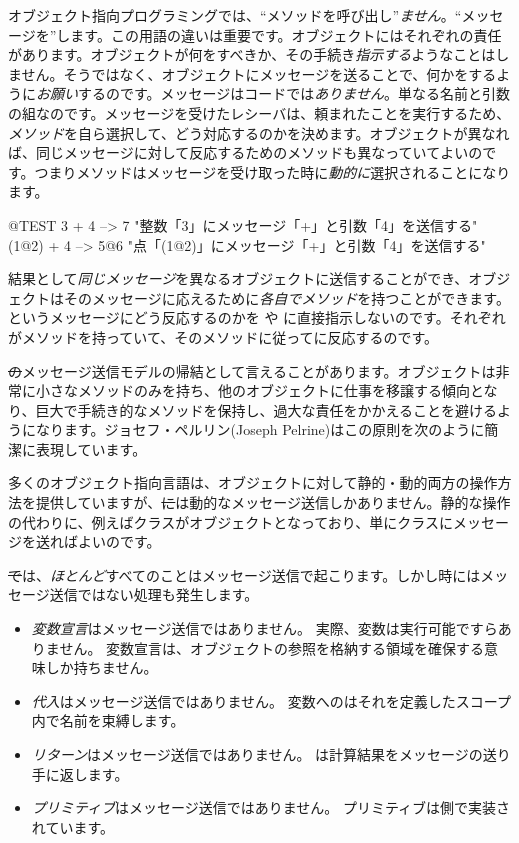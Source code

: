 \documentclass[a4paper,10pt,twoside]{book}
\begin{document}
オブジェクト指向プログラミングでは、``メソッドを呼び出し''\emph{ません}。``メッセージを''します。この用語の違いは重要です。オブジェクトにはそれぞれの責任があります。オブジェクトが何をすべきか、その手続き\emph{指示する}ようなことはしません。そうではなく、オブジェクトにメッセージを送ることで、何かをするように\emph{お願い}するのです。メッセージはコードでは\emph{ありません}。単なる名前と引数の組なのです。メッセージを受けたレシーバは、頼まれたことを実行するため、\emph{メソッド}を自ら選択して、どう対応するのかを決めます。オブジェクトが異なれば、同じメッセージに対して反応するためのメソッドも異なっていてよいのです。つまりメソッドはメッセージを受け取った時に\emph{動的に}選択されることになります。

\begin{code}{@TEST}
3 + 4         --> 7          "整数「3」にメッセージ「+」と引数「4」を送信する"
(1@2) + 4 --> 5@6    "点「(1@2)」にメッセージ「+」と引数「4」を送信する"
\end{code}

\noindent
結果として\emph{同じメッセージ}を異なるオブジェクトに送信することができ、オブジェクトはそのメッセージに応えるために\emph{各自でメソッド}を持つことができます。というメッセージにどう反応するのかを や に直接指示しないのです。それぞれが\ct{+}メソッドを持っていて、そのメソッドに従ってに反応するのです。

\st のメッセージ送信モデルの帰結として言えることがあります。オブジェクトは非常に小さなメソッドのみを持ち、他のオブジェクトに仕事を移譲する傾向となり、巨大で手続き的なメソッドを保持し、過大な責任をかかえることを避けるようになります。ジョセフ・ペルリン(Joseph Pelrine)はこの原則を次のように簡潔に表現しています。

多くのオブジェクト指向言語は、オブジェクトに対して静的・動的両方の操作方法を提供していますが、\st には動的なメッセージ送信しかありません。静的な操作の代わりに、例えばクラスがオブジェクトとなっており、単にクラスにメッセージを送ればよいのです。

\st では、\emph{ほとんど}すべてのことはメッセージ送信で起こります。しかし時にはメッセージ送信ではない処理も発生します。

\begin{itemize}
  \item \emph{変数宣言}はメッセージ送信ではありません。
		実際、変数は実行可能ですらありません。
		変数宣言は、オブジェクトの参照を格納する領域を確保する意味しか持ちません。
  \item \emph{代入}はメッセージ送信ではありません。
		変数へのはそれを定義したスコープ内で名前を束縛します。
  \item \emph{リターン}はメッセージ送信ではありません。
		は計算結果をメッセージの送り手に返します。
  \item \emph{プリミティブ}はメッセージ送信ではありません。
		プリミティブは側で実装されています。
\end{itemize}
\end{document}
